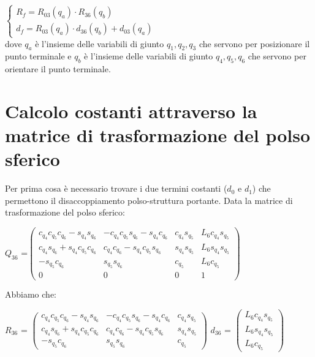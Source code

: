 \documentclass[a4paper,12pt]{article}
\begin{document}
		$\left\{ \begin{array} {ll} 
		R_f  = R_{03}(q_a) \cdot  R_{36}(q_b) \\
		d_f = R_{03}(q_a) \cdot d_{36}(q_b) + d_{03}(q_a)
		\end{array}
		\right.$ \\

dove $q_a$ è l'insieme delle variabili di giunto $q_1, q_2, q_3$ che servono per posizionare il punto terminale e $q_b$ è l'insieme delle variabili di giunto $q_4, q_5, q_6$ che servono per orientare il punto terminale.

\pagebreak

\section{Calcolo costanti attraverso la matrice di trasformazione del polso sferico}
Per prima cosa è necessario trovare i due termini costanti ($d_0$ e $d_1$) che permettono il disaccoppiamento polso-struttura portante. Data la matrice di trasformazione del polso sferico:

\begin{center}
$Q_{36}$ =$\begin{pmatrix}
{c_{{q_4}}} {c_{{q_5}}} {c_{{q_6}}}-{s_{{q_4}}} {s_{{q_6}}} & -{c_{{q_4}}} {c_{{q_5}}} {s_{{q_6}}}-{s_{{q_4}}} {c_{{q_6}}} & {c_{{q_4}}} {s_{{q_5}}} & {L_6} {c_{{q_4}}} {s_{{q_5}}}\\
{c_{{q_4}}} {s_{{q_6}}}+{s_{{q_4}}} {c_{{q_5}}} {c_{{q_6}}} & {c_{{q_4}}} {c_{{q_6}}}-{s_{{q_4}}} {c_{{q_5}}} {s_{{q_6}}} & {s_{{q_4}}} {s_{{q_5}}} & {L_6} {s_{{q_4}}} {s_{{q_5}}}\\
-{s_{{q_5}}} {c_{{q_6}}} & {s_{{q_5}}} {s_{{q_6}}} & {c_{{q_5}}} & {L_6} {c_{{q_5}}}\\
0 & 0 & 0 & 1
\end{pmatrix}$
\end{center}
Abbiamo che:

\begin{center}
$R_{36}$ = $\begin{pmatrix}{c_{{q_4}}} {c_{{q_5}}} {c_{{q_6}}}-{s_{{q_4}}} {s_{{q_6}}} & -{c_{{q_4}}} {c_{{q_5}}} {s_{{q_6}}}-{s_{{q_4}}} {c_{{q_6}}} & {c_{{q_4}}} {s_{{q_5}}}\\
{c_{{q_4}}} {s_{{q_6}}}+{s_{{q_4}}} {c_{{q_5}}} {c_{{q_6}}} & {c_{{q_4}}} {c_{{q_6}}}-{s_{{q_4}}} {c_{{q_5}}} {s_{{q_6}}} & {s_{{q_4}}} {s_{{q_5}}}\\
-{s_{{q_5}}} {c_{{q_6}}} & {s_{{q_5}}} {s_{{q_6}}} & {c_{{q_5}}}\end{pmatrix}$
\space\space\space\space\space   
$d_{36}$ = $\begin{pmatrix}{L_6} {c_{{q_4}}} {s_{{q_5}}}\\
{L_6} {s_{{q_4}}} {s_{{q_5}}}\\
{L_6} {c_{{q_5}}}\end{pmatrix}$
\end{center}
\end{document}
